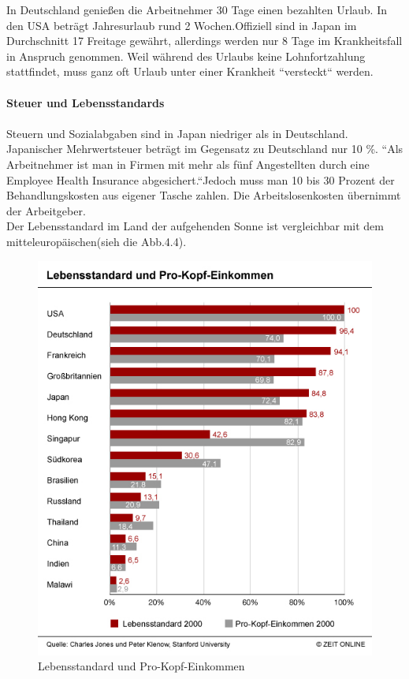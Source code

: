	In Deutschland genießen die Arbeitnehmer 30 Tage einen bezahlten Urlaub. In den USA beträgt Jahresurlaub rund 2 Wochen.Offiziell sind in Japan im Durchschnitt 17 Freitage gewährt, allerdings werden nur 8 Tage im Krankheitsfall in Anspruch genommen. Weil während des Urlaubs keine Lohnfortzahlung stattfindet, muss ganz oft Urlaub unter einer Krankheit ``versteckt`` werden.\\
	\\
		\textbf{Steuer und Lebensstandards}\\
		\\
		Steuern und Sozialabgaben sind in Japan niedriger als in Deutschland. Japanischer Mehrwertsteuer beträgt im Gegensatz zu Deutschland nur 10 \%.
		``Als Arbeitnehmer ist man in Firmen mit mehr als fünf Angestellten durch eine Employee Health Insurance abgesichert.``Jedoch muss man 10 bis 30 Prozent der Behandlungskosten aus eigener Tasche zahlen. Die Arbeitslosenkosten übernimmt der Arbeitgeber. %
		\\Der Lebensstandard im Land der aufgehenden Sonne ist vergleichbar mit dem mitteleuropäischen(sieh die Abb.4.4).
		\begin{figure}[ht]
		\centering
		\includegraphics[width=0.7\linewidth]{./images/Lebensstandard-Pro-Kopf-Einkommen}
		\caption{Lebensstandard und Pro-Kopf-Einkommen}
		\label{fig:LebStdProKEink}
		\end{figure}\\
